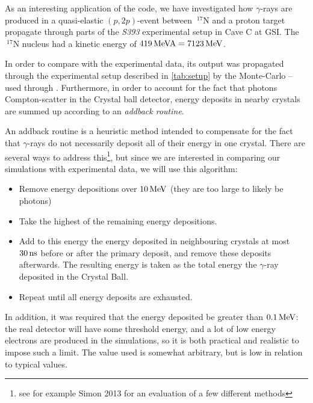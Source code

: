 As an interesting application of the code, we have investigated how $\gamma$-rays are produced in a quasi-elastic $(p,2p)$-event between $~^{17}\mathrm{N}$ and a proton target propagate through parts of the \emph{S393} experimental setup in Cave C at GSI. The $~^{17}\mathrm{N}$ nucleus had a kinetic energy of $\unit[419]{MeV A} = \unit[7123]{MeV}$.

In order to compare \codename{} with the experimental data, its output was propagated through the experimental setup described in \autoref{tab:setup} by the Monte-Carlo  -- used through .
Furthermore, in order to account for the fact that photons Compton-scatter in the Crystal ball detector, energy deposits in nearby crystals are summed up according to an \emph{addback routine}. 

An addback routine is a heuristic method intended to compensate for the fact that $\gamma$-rays do not necessarily deposit all of their energy in one crystal. There are several ways to address this\footnote{see for example Simon 2013\cite{simon:2013:thesis} for an evaluation of a few different methods}, but since we are interested in comparing our simulations with experimental data, we will use this algorithm:
\begin{itemize}
\item Remove energy depositions over $\unit[10]{MeV}$ (they are too large to likely be photons)
\item Take the highest of the remaining energy depositions.
\item Add to this energy the energy deposited in neighbouring crystals at most $\unit[30]{ns}$ before or after the primary deposit, and remove these deposits afterwards. The resulting energy is taken as the total energy the $\gamma$-ray deposited in the Crystal Ball.
\item Repeat until all energy deposits are exhausted.
\end{itemize}
In addition, it was required that the energy deposited be greater than $\unit[0.1]{MeV}$: the real detector will have some threshold energy, and a lot of low energy electrons are produced in the simulations, so it is both practical and realistic to impose such a limit. The value used is somewhat arbitrary, but is low in relation to typical values.

